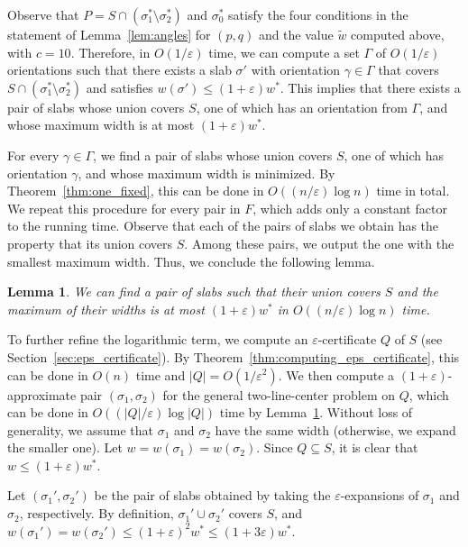 \documentclass[10pt,a4paper]{article}
\newtheorem{lemma}[theorem]{Lemma}
\theoremstyle{star}
\theoremstyle{claimstar}
\newcommand{\eps}{\ensuremath{\varepsilon}}
\begin{document}
Observe that $P = S \cap (\sigma_1^* \setminus \sigma_2^*)$ and $\sigma_0^*$ satisfy the four conditions in the statement of Lemma~\ref{lem:angles} for $(p, q)$ and the value $\widetilde w$ computed above, with $c = 10$.  
Therefore, in $O(1/\eps)$ time, we can compute a set $\Gamma$ of $O(1/\eps)$ orientations such that there exists a slab $\sigma'$ with orientation $\gamma \in \Gamma$ that covers $S \cap (\sigma_1^* \setminus \sigma_2^*)$ and satisfies $w(\sigma') \le (1+\eps) w^*$.  
This implies that there exists a pair of slabs whose union covers $S$, one of which has an orientation from $\Gamma$, and whose maximum width is at most $(1+\eps) w^*$.

For every $\gamma \in \Gamma$, we find a pair of slabs whose union covers $S$, one of which has orientation $\gamma$, and whose maximum width is minimized. 
By Theorem~\ref{thm:one_fixed}, this can be done in $O((n/\eps) \log n)$ time in total.  
We repeat this procedure for every pair in $F$, which adds only a constant factor to the running time.
Observe that each of the pairs of slabs we obtain has the property that its union covers $S$.
Among these pairs, we output the one with the smallest maximum width.  
Thus, we conclude the following lemma.



\begin{lemma}  
    \label{lem:general_temp}
    We can find a pair of slabs such that their union covers $S$ and the maximum of their widths is at most $(1+\eps)w^*$ in $O((n/\eps) \log n)$ time. 
\end{lemma}



To further refine the logarithmic term, we compute an $\eps$-certificate $Q$ of $S$ (see Section~\ref{sec:eps_certificate}). 
By Theorem~\ref{thm:computing_eps_certificate}, this can be done in $O(n)$ time and $|Q| = O(1/\eps^2)$. 
We then compute a $(1+\eps)$-approximate pair $(\sigma_1, \sigma_2)$ for the general two-line-center problem on $Q$, which can be done in $O((|Q|/\eps)\log |Q|)$ time by Lemma~\ref{lem:general_temp}.
Without loss of generality, we assume that $\sigma_1$ and $\sigma_2$ have the same width (otherwise, we expand the smaller one).
Let $w = w(\sigma_1) =  w(\sigma_2)$. 
Since $Q \subseteq S$, it is clear that $w \le (1+\eps)w^*$.

Let $(\sigma_1', \sigma_2')$ be the pair of slabs obtained by taking the $\eps$-expansions of $\sigma_1$ and $\sigma_2$, respectively. 
By definition, $\sigma_1' \cup \sigma_2'$ covers $S$, and 
$w(\sigma_1')= w(\sigma_2') \le (1+\eps)^2 w^* \le (1 +3\eps) w^*$.
\end{document}
